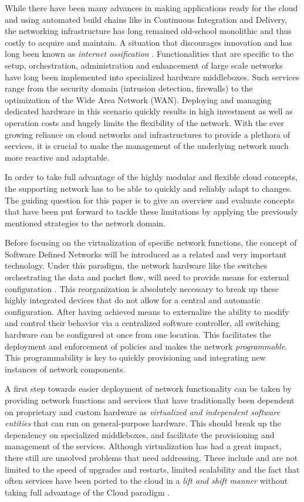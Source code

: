 While there have been many advances in making applications ready for the cloud  and using automated build chains like in Continuous Integration and Delivery,  the networking infrastructure has long remained old-school monolithic and thus costly to acquire and maintain. A situation that discourages innovation and has long been known as \textit{internet ossification} \cite{nunes2014survey}. Functionalities that are specific to the setup, orchestration, administration and enhancement of large scale networks have long been implemented into specialized hardware middleboxes. Such services range from the security domain (intrusion detection, firewalls) to the optimization of the Wide Area Network (WAN). Deploying and managing dedicated hardware in this scenario quickly results in high investment as well as operation costs and hugely limits the flexibility of the network. With the ever growing reliance on cloud networks and infrastructures to provide a plethora of services, it is crucial to make the management of the underlying network much more reactive and adaptable. 

In order to take full advantage of the highly modular and flexible cloud concepts, the supporting network has to be able to quickly and reliably adapt to changes. The guiding question for this paper is to give an overview and evaluate concepts that have been put forward to tackle these limitations by applying the previously mentioned strategies to the network domain.

Before focusing on the virtualization of specific network functions, the concept of Software Defined Networks will be introduced as a related and very important technology. Under this paradigm, the network hardware like the switches orchestrating the data and packet flow, will need to provide means for external configuration . This reorganization is absolutely necessary to break up these highly integrated devices that do not allow for a central and automatic configuration. After having achieved means to externalize the ability to modify and control their behavior via a centralized software controller, all switching hardware can be configured at once from one location. This facilitates the deployment and enforcement of policies and makes the network \textit{programmable}. This programmability is key to quickly provisioning and integrating new instances of network components. 

A first step towards easier deployment of network functionality can be taken by providing network functions  and services that have traditionally been dependent on proprietary and custom hardware as \textit{virtualized and independent software entities} that can run on general-purpose hardware. This should break up the dependency on specialized middleboxes, and facilitate the provisioning and management of the services. Although virtualization has had a great impact, there still are unsolved problems that need addressing. These include and are not limited to the speed of upgrades and restarts, limited scalability and the fact that often services have been ported to the cloud in a \textit{lift and shift manner} without taking full advantage of the Cloud paradigm \cite{CNF}.


